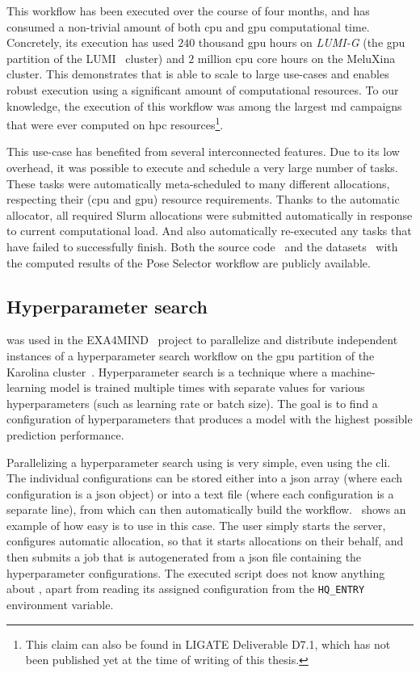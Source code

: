 This workflow has been executed over the course of four months, and has consumed a non-trivial
amount of both \gls{cpu} and \gls{gpu} computational time. Concretely,
its execution has used $240$ thousand \gls{gpu} hours on
\emph{LUMI-G}
(the \gls{gpu} partition of the LUMI~\cite{lumi} cluster) and $2$ million \gls{cpu} core hours on
the MeluXina~\cite{meluxina} cluster. This demonstrates that \hyperqueue{} is
able to scale to large use-cases and enables robust execution using a significant amount of
computational resources. To our knowledge, the execution of this workflow was among the largest
\gls{md} campaigns that were ever computed on \gls{hpc}
resources\footnote{This claim can also be found in LIGATE Deliverable D7.1, which has not been published yet at the time of writing of this thesis.}.

This use-case has benefited from several interconnected \hyperqueue{} features. Due to
its low overhead, it was possible to execute and schedule a very large number of tasks. These tasks
were automatically meta-scheduled to many different allocations, respecting their
(\gls{cpu} and \gls{gpu}) resource requirements. Thanks to the
automatic allocator, all required Slurm allocations were submitted automatically in response to
current computational load. And \hyperqueue{} also automatically re-executed any tasks
that have failed to successfully finish. Both the source code~\cite{ps-workflow} and the
datasets~\cite{ps_dataset_1,ps_dataset_2} with the computed results of the Pose Selector workflow are
publicly available.

\subsection{Hyperparameter search}
\hyperqueue{} was used in the EXA4MIND~\cite{exa4mind} project to parallelize and
distribute independent instances of a hyperparameter search workflow on the \gls{gpu}
partition of the Karolina cluster~\cite{karolina}. Hyperparameter search is a technique
where a machine-learning model is trained multiple times with separate values for various
hyperparameters (such as learning rate or batch size). The goal is to find a configuration of
hyperparameters that produces a model with the highest possible prediction performance.

Parallelizing a hyperparameter search using \hyperqueue{} is very simple, even using the
\gls{cli}. The individual configurations can be stored either into a
\gls{json} array (where each configuration is a \gls{json} object) or
into a text file (where each configuration is a separate line), from which \hq{}
can then automatically build the workflow.~ shows an example of how easy is
to use \hq{} in this case. The user simply starts the server, configures
automatic allocation, so that it starts allocations on their behalf, and then submits a job that is
autogenerated from a \gls{json} file containing the hyperparameter configurations. The
executed script does not know anything about \hyperqueue{}, apart from reading its
assigned configuration from the \texttt{HQ\_ENTRY} environment variable.

